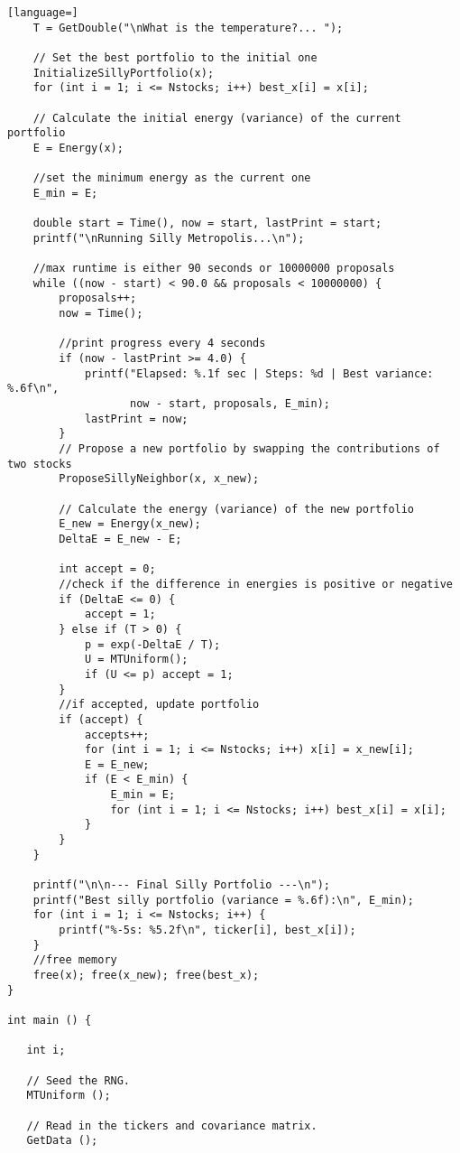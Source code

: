 \documentclass{report}
\begin{document}
\begin{lstlisting}[language=]
    T = GetDouble("\nWhat is the temperature?... ");

    // Set the best portfolio to the initial one
    InitializeSillyPortfolio(x);
    for (int i = 1; i <= Nstocks; i++) best_x[i] = x[i];

    // Calculate the initial energy (variance) of the current portfolio
    E = Energy(x);

    //set the minimum energy as the current one
    E_min = E;

    double start = Time(), now = start, lastPrint = start;
    printf("\nRunning Silly Metropolis...\n");

    //max runtime is either 90 seconds or 10000000 proposals
    while ((now - start) < 90.0 && proposals < 10000000) {
        proposals++;
        now = Time();

        //print progress every 4 seconds
        if (now - lastPrint >= 4.0) {
            printf("Elapsed: %.1f sec | Steps: %d | Best variance: %.6f\n",
                   now - start, proposals, E_min);
            lastPrint = now;
        }
        // Propose a new portfolio by swapping the contributions of two stocks
        ProposeSillyNeighbor(x, x_new);

        // Calculate the energy (variance) of the new portfolio
        E_new = Energy(x_new);
        DeltaE = E_new - E;

        int accept = 0;
        //check if the difference in energies is positive or negative
        if (DeltaE <= 0) {
            accept = 1;
        } else if (T > 0) {
            p = exp(-DeltaE / T);
            U = MTUniform();
            if (U <= p) accept = 1;
        }
        //if accepted, update portfolio
        if (accept) {
            accepts++;
            for (int i = 1; i <= Nstocks; i++) x[i] = x_new[i];
            E = E_new;
            if (E < E_min) {
                E_min = E;
                for (int i = 1; i <= Nstocks; i++) best_x[i] = x[i];
            }
        }
    }

    printf("\n\n--- Final Silly Portfolio ---\n");
    printf("Best silly portfolio (variance = %.6f):\n", E_min);
    for (int i = 1; i <= Nstocks; i++) {
        printf("%-5s: %5.2f\n", ticker[i], best_x[i]);
    }
    //free memory
    free(x); free(x_new); free(best_x);
}

int main () {

   int i;

   // Seed the RNG.
   MTUniform ();

   // Read in the tickers and covariance matrix.
   GetData ();


\end{lstlisting}
\end{document}
